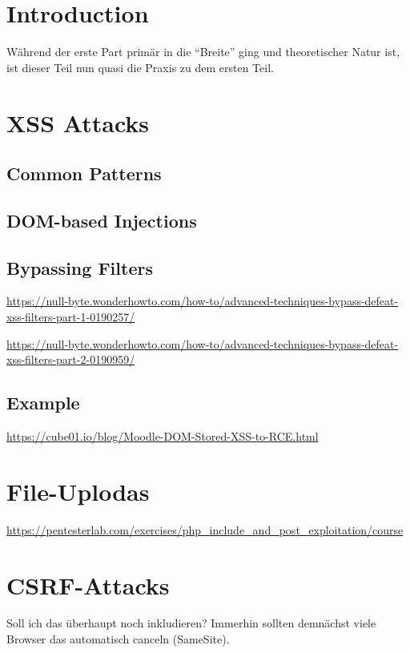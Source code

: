 \chapter{Introduction}

Während der erste Part primär in die ``Breite'' ging und theoretischer Natur ist, ist dieser Teil nun quasi die Praxis zu dem ersten Teil.

\chapter{XSS Attacks}

\section{Common Patterns}

\section{DOM-based Injections}

\section{Bypassing Filters}

\url{https://null-byte.wonderhowto.com/how-to/advanced-techniques-bypass-defeat-xss-filters-part-1-0190257/}

\url{https://null-byte.wonderhowto.com/how-to/advanced-techniques-bypass-defeat-xss-filters-part-2-0190959/}

\section{Example}

\url{https://cube01.io/blog/Moodle-DOM-Stored-XSS-to-RCE.html}

\chapter{File-Uplodas}

\url{https://pentesterlab.com/exercises/php_include_and_post_exploitation/course}

\chapter{CSRF-Attacks}

Soll ich das überhaupt noch inkludieren? Immerhin sollten demnächst viele Browser das automatisch canceln (SameSite).

